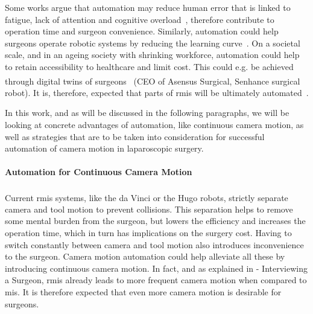 
Some works argue that automation may reduce human error that is linked to fatigue, lack of attention and cognitive overload~\cite{fiorini2022concepts}, therefore contribute to operation time and surgeon convenience. Similarly, automation could help surgeons operate robotic systems by reducing the learning curve~\cite{van2018learning}. On a societal scale, and in an ageing society with shrinking workforce, automation could help to retain accessibility to healthcare and limit cost. This could e.g. be achieved through digital twins of surgeons~\cite{zidane2023robotics} (CEO of Asensus Surgical, Senhance\textsuperscript{\texttrademark} surgical robot). It is, therefore, expected that parts of \gls{rmis} will be ultimately automated~\cite{davenport2019potential,zidane2022robotics}.

In this work, and as will be discussed in the following paragraphs, we will be looking at concrete advantages of automation, like continuous camera motion, as well as strategies that are to be taken into consideration for successful automation of camera motion in laparoscopic surgery.


\paragraph{Automation for Continuous Camera Motion} Current \gls{rmis} systems, like the da Vinci\textsuperscript{\textregistered} or the Hugo\textsuperscript{\texttrademark} robots, strictly separate camera and tool motion to prevent collisions. This separation helps to remove some mental burden from the surgeon, but lowers the efficiency and increases the operation time, which in turn has implications on the surgery cost. Having to switch constantly between camera and tool motion also introduces inconvenience to the surgeon. Camera motion automation could help alleviate all these by introducing continuous camera motion. In fact, and as explained in  - Interviewing a Surgeon, \gls{rmis} already leads to more frequent camera motion when compared to \gls{mis}. It is therefore expected that even more camera motion is desirable for surgeons.

